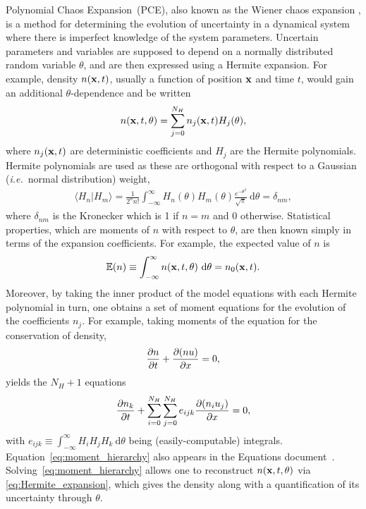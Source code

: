 Polynomial Chaos Expansion~(PCE), also known as the Wiener chaos expansion \cite{Wi38Homo},
is a method for determining the evolution of uncertainty in a dynamical system
where there is imperfect knowledge of the system parameters.
Uncertain parameters and variables are supposed to depend on a normally distributed random variable $\theta$,
and are then expressed using a Hermite expansion.
For example, density $n(\mathbf{x},t)$, usually a function of position $\mathbf{x}$ and time $t$, would gain an additional $\theta$-dependence and 
be written
\begin{align}
	\label{eq:Hermite_expansion}
	n(\mathbf{x},t,\theta) = \sum_{j=0}^{N_H} n_j(\mathbf{x},t)H_j(\theta),
\end{align}
where $n_j(\mathbf{x},t)$ are deterministic coefficients and $H_j$ are the Hermite polynomials.
Hermite polynomials are used as these are orthogonal with respect to a Gaussian (\emph{i.e.}\ normal distribution) weight,
\begin{align}
	\label{eq:orthogonality}
	\langle H_n | H_m \rangle =
	\frac{1}{2^nn!}\int_{-\infty}^{\infty} H_n(\theta)H_m(\theta)\frac{e^{-\theta^2}}{\sqrt{\pi}} \ \mathrm{d}\theta = \delta_{nm},
\end{align}
where $\delta_{nm}$ is the Kronecker which is 1 if $n=m$ and 0 otherwise.
Statistical properties, which are moments of $n$ with respect to $\theta$, are then known simply in terms of the expansion coefficients.
For example, the expected value of $n$ is
\begin{align}
	\mathbb{E}(n) \equiv \int_{-\infty}^{\infty} n(\x,t,\theta)\ \mathrm{d}\theta = n_0(\x,t).
\end{align}
Moreover, by taking the inner product of the model equations with each Hermite polynomial in turn,
one obtains a set of moment equations for the evolution of the coefficients $n_j$.
For example, taking moments of the equation for the conservation of density,
\begin{align}
	\label{eq:density}
	\frac{\partial n}{\partial t} + \frac{\partial (nu)}{\partial x} = 0,
\end{align}
yields the $N_H+1$ equations
\begin{align}
	\label{eq:moment_hierarchy}
	\frac{\partial n_k}{\partial t} + \sum_{i=0}^{N_H}\sum_{j=0}^{N_H}e_{ijk}\frac{\partial (n_iu_j)}{\partial x} = 0,
\end{align}
with $e_{ijk}\equiv \int_{-\infty}^{\infty}H_iH_jH_k\ \mathrm{d}\theta$ being (easily-computable) integrals.
Equation~\eqref{eq:moment_hierarchy} also appears in the Equations document~\cite{pappeqs}.
Solving~\eqref{eq:moment_hierarchy} allows one to reconstruct $n(\mathbf{x},t,\theta)$ via \eqref{eq:Hermite_expansion}, which gives the density along with a quantification of its uncertainty through $\theta$. 

